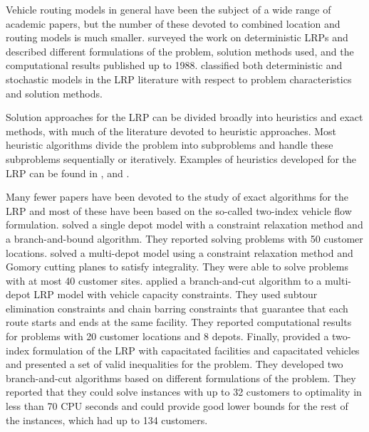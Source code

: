 \documentclass[graybox]{./styles/svmult}
\begin{document}
Vehicle routing models in general have been the subject of a wide range of
academic papers, but the number of these devoted to combined location and
routing models is much smaller. \citet{Laporte} surveyed the work on
deterministic LRPs and described different formulations of the problem,
solution methods used, and the computational results published up to 1988.
\citet{Min} classified both deterministic and stochastic models in the LRP
literature with respect to problem characteristics and solution methods. 

Solution approaches for the LRP can be divided broadly into heuristics
and exact methods, with much of the literature devoted to heuristic
approaches. Most heuristic algorithms divide the problem into
subproblems and handle these subproblems sequentially or iteratively.
Examples of heuristics developed for the LRP can be found in
\citet{Perl}, \citet{Hansen} and \citet{Barreto07}. 

Many fewer papers have been devoted to the study of exact algorithms
for the LRP and most of these have been based on the so-called
two-index vehicle flow formulation. \citet{Laporte81} solved a single
depot model with a constraint relaxation method and a branch-and-bound
algorithm. They reported solving problems with 50 customer locations.
\citet{Laporte83} solved a multi-depot model using a constraint
relaxation method and Gomory cutting planes to satisfy integrality.
They were able to solve problems with at most 40 customer sites.
\citet{Laporte86} applied a branch-and-cut algorithm to a multi-depot
LRP model with vehicle capacity constraints. They used subtour
elimination constraints and chain barring constraints that guarantee
that each route starts and ends at the same facility. They reported
computational results for problems with 20 customer locations and 8
depots. Finally, \citet{Belenguer} provided a two-index formulation of
the LRP with capacitated facilities and capacitated vehicles and
presented a set of valid inequalities for the problem. They developed
two branch-and-cut algorithms based on different formulations of the
problem. They reported that they could solve instances with up to
32 customers to optimality in less than 70 CPU seconds and could provide
good lower bounds for the rest of the instances, which had up to 134
customers.
\end{document}

